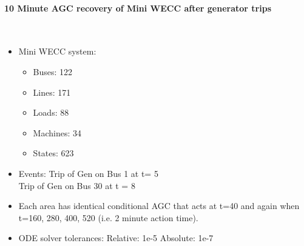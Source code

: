 \documentclass[12pt]{article}
\begin{document}
\onehalfspacing
\paragraph{10 Minute AGC recovery of Mini WECC after generator trips} \ \\

\begin{minipage}{0.47\linewidth}
\begin{itemize}
\item Mini WECC system:
\begin{itemize}
 em
\small
\item Buses: 122
\item Lines: 171
\item Loads: 88
\item Machines: 34
\item States: 623
\end{itemize}
\item Events: Trip of Gen on Bus 1 at t= 5\\ Trip of Gen on Bus 30 at t = 8

\item Each area has identical conditional AGC that acts at t=40 and again when t=160, 280, 400, 520 (i.e. 2 minute action time).

\item ODE solver tolerances:
\subitem Relative: 1e-5
\subitem Absolute: 1e-7

\end{itemize}
\vfill
\end{minipage}\hspace{2em}%
\end{document}
